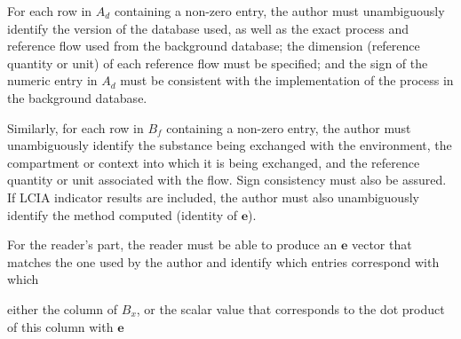 
For each row in $A_d$ containing a non-zero entry, the author must unambiguously identify the version of the database used, as well as the exact process and reference flow used from the background database; the dimension (reference quantity or unit) of each reference flow must be specified; and the sign of the numeric entry in $A_d$ must be consistent with the implementation of the process in the background database.  


Similarly, for each row in $B_f$ containing a non-zero entry, the author must unambiguously identify the substance being exchanged with the environment, the compartment or context into which it is being exchanged, and the reference quantity or unit associated with the flow.  Sign consistency must also be assured.  If LCIA indicator results are included, the author must also unambiguously identify the method computed (identity of $\mathbf{e}$).  

For the reader's part, the reader must be able to produce an $\mathbf{e}$ vector that matches the one used by the author and identify which entries correspond with which 

either the column of $B_x$, or the scalar value that corresponds to the dot product of this column with $\mathbf{e}$


